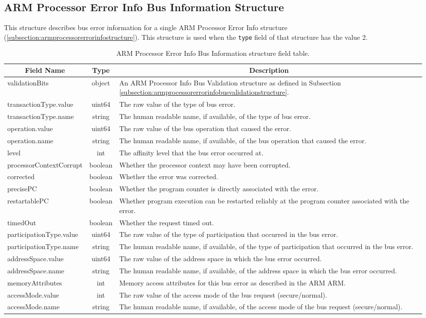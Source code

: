 \documentclass{report}
\newcommand*{\thead}[1]{\multicolumn{1}{|c|}{\bfseries #1}}
\newcommand*{\jsontable}[1]{
    \begin{table}[!ht]
    \label{#1}
    \centering
    \begin{adjustbox}{center}
    \begin{tabular}{|l|c|p{8cm}|}
    \hline
    \thead{Field Name} & \thead{Type} & \thead{Description} \\
    \hline
}
\newcommand*{\jsontableend}[1]{
    \hline
    \end{tabular}
    \end{adjustbox}
    \caption{#1}
    \label{table:#1}
    \end{table}
    \FloatBarrier
}
\begin{document}
\subsection{ARM Processor Error Info Bus Information Structure}
\label{subsection:armprocessorerrorinfoerrorinformationbusstructure}
This structure describes bus error information for a single ARM Processor Error Info structure (\ref{subsection:armprocessorerrorinfostructure}). This structure is used when the \texttt{type} field of that structure has the value 2.
\jsontable{table:armprocessorerrorinfoerrorinformationbusstructure}
validationBits & object & An ARM Processor Info Bus Validation structure as defined in Subsection \ref{subsection:armprocessorerrorinfobusvalidationstructure}.\\
\hline
transactionType.value & uint64 & The raw value of the type of bus error.\\
transactionType.name & string & The human readable name, if available, of the type of bus error.\\
\hline
operation.value & uint64 & The raw value of the bus operation that caused the error.\\
operation.name & string & The human readable name, if available, of the bus operation that caused the error.\\
\hline
level & int & The affinity level that the bus error occurred at.\\
\hline
processorContextCorrupt & boolean & Whether the processor context may have been corrupted.\\
\hline
corrected & boolean & Whether the error was corrected.\\
\hline
precisePC & boolean & Whether the program counter is directly associated with the error.\\
\hline
restartablePC & boolean & Whether program execution can be restarted reliably at the program counter associated with the error.\\
\hline
timedOut & boolean & Whether the request timed out.\\
\hline
participationType.value & uint64 & The raw value of the type of participation that occurred in the bus error.\\
participationType.name & string & The human readable name, if available, of the type of participation that occurred in the bus error.\\
\hline
addressSpace.value & uint64 & The raw value of the address space in which the bus error occurred.\\
addressSpace.name & string & The human readable name, if available, of the address space in which the bus error occurred.\\
\hline
memoryAttributes & int & Memory access attributes for this bus error as described in the ARM ARM.\\
\hline
accessMode.value & int & The raw value of the access mode of the bus request (secure/normal).\\
accessMode.name & string & The human readable name, if available, of the access mode of the bus request (secure/normal).\\
\jsontableend{ARM Processor Error Info Bus Information structure field table.}
\end{document}
